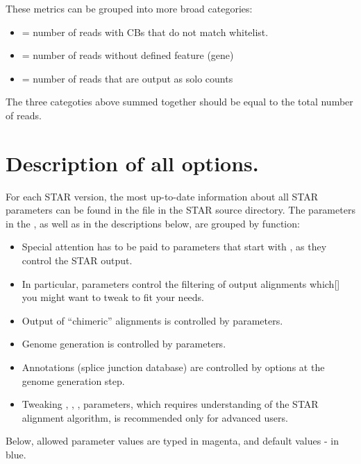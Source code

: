 \documentclass[12pt]{article}
\begin{document}
These metrics can be grouped into more broad categories:
\begin{itemize}
	\itemsep -0.3em
	\item[] = number of reads with CBs that do not match whitelist.
	\item[] = number of reads without defined feature (gene)
	\item[] = number of reads that are output as solo counts

\end{itemize}
The three categoties above summed together should be equal to the total number of reads.

\section{Description of all options.}\label{Description_of_all_options}
For each STAR version, the most up-to-date information about all STAR parameters can be found in the  file in the STAR source directory. The parameters in the , as well as in the descriptions below, are grouped by function:
\begin{itemize}
\item[] Special attention has to be paid to parameters that start with  , as they control the STAR output.
\item[] In particular,  parameters control the filtering of output alignments which[] you might want to tweak to fit your needs.
\item[] Output of “chimeric” alignments is controlled by  parameters.
\item[] Genome generation is controlled by  parameters.
\item[] Annotations (splice junction database) are controlled by  options at the genome generation step.
\item[] Tweaking , ,  ,  parameters, which requires understanding of the STAR alignment algorithm, is recommended only for advanced users.
\end{itemize}

Below, allowed parameter values are typed in magenta, and default values - in blue.


\newcommand{\pright}[1]{\begin{flushright} \begin{minipage}{0.8\textwidth}\raggedright #1 \end{minipage} \end{flushright}}
\end{document}
